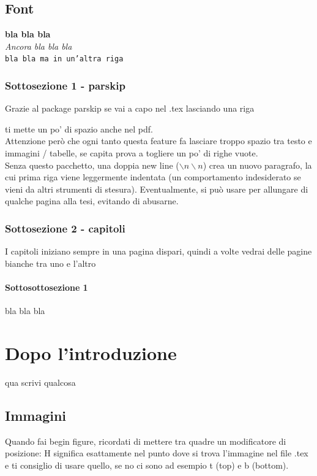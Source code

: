 \documentclass[12pt,a4paper,twoside]{book}
\begin{document}
\section{Font}
\textbf{bla bla bla}\\
\textit{Ancora bla bla bla}\\
\texttt{bla bla ma in un'altra riga}

\subsection{Sottosezione 1 - parskip}
Grazie al package parskip se vai a capo nel .tex lasciando una riga

ti mette un po' di spazio anche nel pdf.\\
Attenzione però che ogni tanto questa feature fa lasciare troppo spazio tra testo e immagini / tabelle, se capita prova a togliere un po' di righe vuote. \\
Senza questo pacchetto, una doppia new line (\texttt{$\backslash n\backslash n$}) crea un nuovo paragrafo, la cui prima riga viene leggermente indentata (un comportamento indesiderato se vieni da altri strumenti di stesura). Eventualmente, si può usare per allungare di qualche pagina alla tesi, evitando di abusarne.
\subsection{Sottosezione 2 - capitoli}
I capitoli iniziano sempre in una pagina dispari, quindi a volte vedrai delle pagine bianche tra uno e l'altro
\subsubsection{Sottosottosezione 1} \label{subsub:bla}
bla bla bla

\chapter{Dopo l'introduzione}
qua scrivi qualcosa
\section{Immagini}
Quando fai begin figure, ricordati di mettere tra quadre un modificatore di posizione: H significa esattamente nel punto dove si trova l'immagine nel file .tex e ti consiglio di usare quello, se no ci sono ad esempio t (top) e b (bottom).
\end{document}
